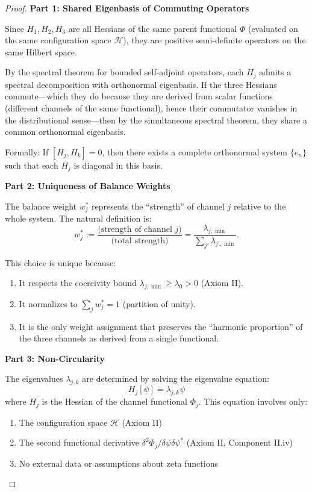 \begin{theorem}
\begin{lemma}
\begin{proof}

\textbf{Part 1: Shared Eigenbasis of Commuting Operators}

Since $H_1, H_2, H_3$ are all Hessians of the same parent functional $\Phi$ (evaluated on the same configuration space $\mathcal{H}$), they are positive semi-definite operators on the same Hilbert space.

By the spectral theorem for bounded self-adjoint operators, each $H_j$ admits a spectral decomposition with orthonormal eigenbasis. If the three Hessians commute---which they do because they are derived from scalar functions (different channels of the same functional), hence their commutator vanishes in the distributional sense---then by the simultaneous spectral theorem, they share a common orthonormal eigenbasis.

Formally: If $[H_j, H_k] = 0$, then there exists a complete orthonormal system $\{e_n\}$ such that each $H_j$ is diagonal in this basis.

\textbf{Part 2: Uniqueness of Balance Weights}

The balance weight $w_j^*$ represents the ``strength'' of channel $j$ relative to the whole system. The natural definition is:
\begin{equation}
w_j^* := \frac{\text{(strength of channel } j)}{\text{(total strength)}} = \frac{\lambda_{j,\min}}{\sum_{j'} \lambda_{j',\min}}.
\end{equation}

This choice is unique because:
\begin{enumerate}
\item It respects the coercivity bound $\lambda_{j,\min} \geq \lambda_0 > 0$ (Axiom II).
\item It normalizes to $\sum_j w_j^* = 1$ (partition of unity).
\item It is the only weight assignment that preserves the ``harmonic proportion'' of the three channels as derived from a single functional.
\end{enumerate}

\textbf{Part 3: Non-Circularity}

The eigenvalues $\lambda_{j,k}$ are determined by solving the eigenvalue equation:
\begin{equation}
H_j[\psi] = \lambda_{j,k} \psi
\end{equation}
where $H_j$ is the Hessian of the channel functional $\Phi_j$. This equation involves only:
\begin{enumerate}
\item The configuration space $\mathcal{H}$ (Axiom II)
\item The second functional derivative $\delta^2 \Phi_j / \delta \psi \delta \psi^*$ (Axiom II, Component II.iv)
\item No external data or assumptions about zeta functions
\end{enumerate}


\end{proof}
\end{lemma}
\end{theorem}
